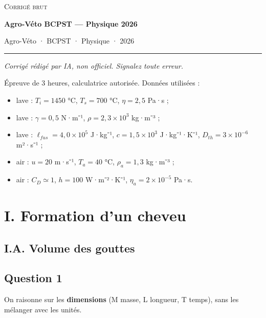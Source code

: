\documentclass[11pt,a4paper]{article}
\providecommand{\tightlist}{\setlength{\itemsep}{0pt}\setlength{\parskip}{0pt}}
\begin{document}
\thispagestyle{plain}
\begin{center}
  {\small\scshape Corrigé brut}\par\smallskip
  {\LARGE\bfseries Agro-Véto BCPST — Physique 2026\par}\medskip
  {\large Agro-Véto · BCPST · Physique · 2026\par}
\end{center}
\vspace{2pt}\hrule\vspace{8pt}

\emph{Corrigé rédigé par IA, non officiel. Signalez toute erreur.}

Épreuve de 3 heures, calculatrice autorisée. Données utilisées :

\begin{itemize}
\tightlist
\item
  lave : \(T_i = 1450\) °C, \(T_s = 700\) °C, \(\eta = 2{,}5\) Pa·s ;
\item
  lave : \(\gamma = 0{,}5\) N·m⁻¹, \(\rho = 2{,}3\times10^3\) kg·m⁻³ ;
\item
  lave : \(\ell_{fus} = 4{,}0\times10^5\) J·kg⁻¹, \(c = 1{,}5\times10^3\) J·kg⁻¹·K⁻¹, \(D_{th} = 3\times10^{-6}\) m²·s⁻¹ ;
\item
  air : \(u = 20\) m·s⁻¹, \(T_a = 40\) °C, \(\rho_a = 1{,}3\) kg·m⁻³ ;
\item
  air : \(C_D \simeq 1\), \(h = 100\) W·m⁻²·K⁻¹, \(\eta_a = 2\times10^{-5}\) Pa·s.
\end{itemize}

\hypertarget{i.-formation-dun-cheveu}{%
\section{I. Formation d'un cheveu}\label{i.-formation-dun-cheveu}}

\hypertarget{i.a.-volume-des-gouttes}{%
\subsection{I.A. Volume des gouttes}\label{i.a.-volume-des-gouttes}}

\hypertarget{question-1}{%
\subsection{Question 1}\label{question-1}}

On raisonne sur les \textbf{dimensions} (M masse, L longueur, T temps), sans les mélanger avec les unités.
\end{document}
